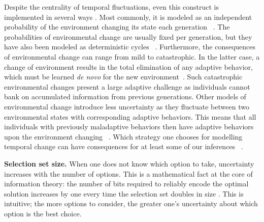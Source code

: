 \documentclass[letterpaper,11.5pt]{scrartcl}
\begin{document}
Despite the centrality of temporal fluctuations, even this construct is implemented in several ways \cite{aoki2014evolution}. Most commonly, it is modeled as an independent probability of the environment changing its state each generation ~\cite{BoydRicherson1985,Rogers1988,Feldman1996,McElreath2005,Enquist2007,perreault2012bayesian,aoki2014evolution}. The probabilities of environmental change are usually fixed per generation, %
but they have also been modeled as deterministic cycles ~\cite{Feldman1996, aoki2014evolution}. Furthermore, the consequences of environmental change can range from mild to  catastrophic. In the latter case, a change of environment results in the total elimination of any adaptive behavior, which must be learned \emph{de novo} for the new environment~\cite{Rogers1988}. Such catastrophic environmental changes present a large adaptive challenge as individuals cannot bank on accumulated information from previous generations. Other models of environmental change introduce less uncertainty as they fluctuate between two environmental states with corresponding adaptive behaviors. This means that all individuals with previously maladaptive behaviors then have adaptive behaviors upon the environment changing ~\cite{perreault2012bayesian}. Which strategy one chooses for modelling temporal change can have consequences for at least some of our inferences  ~\cite{aoki2014evolution}.


\textbf{Selection set size.}
When one does not know which option to take, uncertainty increases with the number of options. This is a mathematical fact at the core of information theory: the number of bits required to reliably encode the optimal solution increases by one every time the selection set doubles in size  \cite{mackay2003information}. 
This is intuitive; the more options to consider, the greater one's uncertainty about which option is the best choice. 
\end{document}
